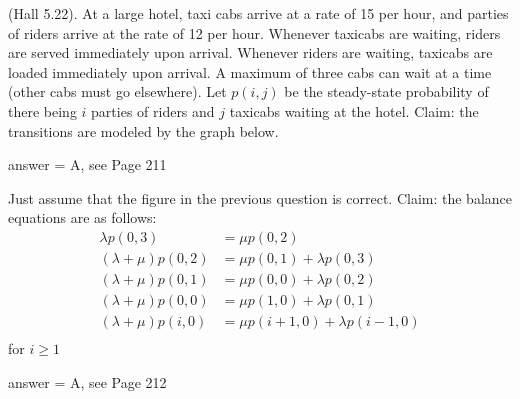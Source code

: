 \begin{exercise}[201807]{1}
  (Hall 5.22). At a large hotel, taxi cabs arrive at a rate of 15 per
  hour, and parties of riders arrive at the rate of 12 per
  hour. Whenever taxicabs are waiting, riders are served immediately
  upon arrival. Whenever riders are waiting, taxicabs are loaded
  immediately upon arrival. A maximum of three cabs can wait at a time (other cabs must go elsewhere). Let $p(i,j)$ be the steady-state probability of there being $i$ parties of riders and $j$ taxicabs waiting at the hotel. Claim: the transitions are modeled by the graph below.

    \begin{center}

    \end{center}
\begin{solution}
answer = A, see Page 211
\end{solution}
\end{exercise}

\begin{exercise}[201807]{1}
Just  assume that the  figure in the previous question is correct. Claim: the balance equations are as follows:
\begin{align*}
\lambda p(0,3) &= \mu p(0,2) \\
(\lambda+\mu) p(0,2) &= \mu p(0,1) + \lambda p(0,3)\\
(\lambda+\mu) p(0,1) &= \mu p(0,0) + \lambda p(0,2)\\
(\lambda+\mu) p(0,0) &= \mu p(1,0) + \lambda p(0,1)\\
(\lambda+\mu) p(i,0) &= \mu p(i+1,0) + \lambda p(i-1,0)\\
\end{align*}
for $i\geq 1$
\begin{solution}
answer = A, see Page 212
\end{solution}
\end{exercise}


